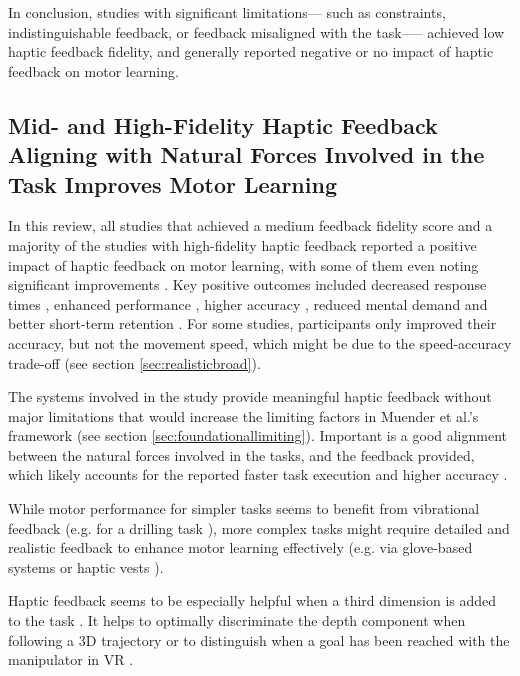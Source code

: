 In conclusion, studies with significant limitations--- such as constraints, indistinguishable feedback, or feedback misaligned with the task—-- achieved low haptic feedback fidelity, and generally reported negative or no impact of haptic feedback on motor learning.


\subsection{Mid- and High-Fidelity Haptic Feedback Aligning with Natural Forces Involved in the Task Improves Motor Learning}

In this review, all studies that achieved a medium feedback fidelity score and a majority of the studies with high-fidelity haptic feedback reported a positive impact of haptic feedback on motor learning, with some of them even noting significant improvements \cite{Yang2023, LiuH2019, Dai2023, Grant2019, Fehlberg2012, Huang2006}. 
Key positive outcomes included decreased response times \cite{Najdovski2020}, enhanced performance \cite{Chappell2022, Fehlberg2012, LiuG2014, Mohanty2023}, higher accuracy \cite{Perez2023}, reduced mental demand \cite{Yang2023, Manivannan2008, Trinitatova2023} and better short-term retention \cite{LeeH2014}.
For some studies, participants only improved their accuracy, but not the movement speed, which might be due to the speed-accuracy trade-off \cite{LiuG2014, Caccianiga2021} (see section \ref{sec:realisticbroad}).

The systems involved in the study provide meaningful haptic feedback without major limitations that would increase the limiting factors in Muender et al.'s framework (see section \ref{sec:foundationallimiting}). Important is a good alignment between the natural forces involved in the tasks, and the feedback provided, which likely accounts for the reported faster task execution and higher accuracy \cite{Najdovski2020, Yang2023}. 

While motor performance for simpler tasks seems to benefit from vibrational feedback (e.g. for a drilling task \cite{Yang2023, Grant2019}), more complex tasks might require detailed and realistic feedback to enhance motor learning effectively (e.g. via glove-based systems \cite{Trinitatova2023} or haptic vests \cite{Xia2023}).

Haptic feedback seems to be especially helpful when a third dimension is added to the task \cite{Feygin2002HapticSkill, Rodriguez2010, Gunter2022, Brickler2019}. It helps to optimally discriminate the depth component when following a 3D trajectory or to distinguish when a goal has been reached with the manipulator in VR \cite{Wall2000}.


